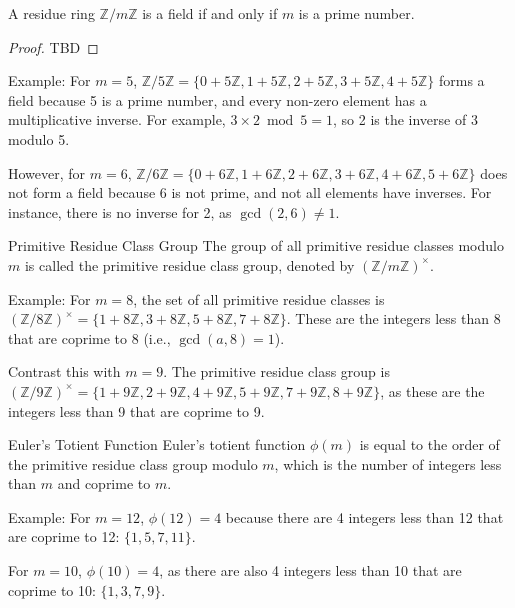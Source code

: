 \documentclass{article}
\begin{document}
\begin{theorem}{}{}
A residue ring $\mathbb{Z} / m\mathbb{Z}$ is a field if and only if $m$ is a prime number.
\end{theorem}

\begin{proof}
    TBD
\end{proof}

Example: For $m = 5$, $\mathbb{Z}/5\mathbb{Z} = \{0 + 5\mathbb{Z}, 1 + 5\mathbb{Z}, 2 + 5\mathbb{Z}, 3 + 5\mathbb{Z}, 4 + 5\mathbb{Z}\}$ forms a field because 5 is a prime number, and every non-zero element has a multiplicative inverse. For example, $3 \times 2 \bmod 5 = 1$, so 2 is the inverse of 3 modulo 5.

However, for $m = 6$, $\mathbb{Z}/6\mathbb{Z} = \{0 + 6\mathbb{Z}, 1+ 6\mathbb{Z}, 2+ 6\mathbb{Z}, 3+ 6\mathbb{Z}, 4+ 6\mathbb{Z}, 5+ 6\mathbb{Z}\}$ does not form a field because 6 is not prime, and not all elements have inverses. For instance, there is no inverse for 2, as $\gcd(2, 6) \neq 1$.

\begin{definition}{Primitive Residue Class Group}{}
The group of all primitive residue classes modulo $m$ is called the primitive residue class group, denoted by $(\mathbb{Z}/m\mathbb{Z})^{\times}$.
\end{definition}

Example: For $m = 8$, the set of all primitive residue classes is $(\mathbb{Z}/8\mathbb{Z})^{\times} = \{1 + 8\mathbb{Z}, 3 + 8\mathbb{Z}, 5 + 8\mathbb{Z}, 7 + 8\mathbb{Z}\}$. These are the integers less than 8 that are coprime to 8 (i.e., $\gcd(a, 8) = 1$).

Contrast this with $m = 9$. The primitive residue class group is $(\mathbb{Z}/9\mathbb{Z})^{\times} = \{1 + 9\mathbb{Z}, 2 + 9\mathbb{Z}, 4 + 9\mathbb{Z}, 5 + 9\mathbb{Z}, 7 + 9\mathbb{Z}, 8 + 9\mathbb{Z}\}$, as these are the integers less than 9 that are coprime to 9.


\begin{definition}{Euler's Totient Function}{}
Euler's totient function $\phi(m)$ is equal to the order of the primitive residue class group modulo $m$, which is the number of integers less than $m$ and coprime to $m$.
\end{definition}

Example: For $m = 12$, $\phi(12) = 4$ because there are 4 integers less than 12 that are coprime to 12: $\{1, 5, 7, 11\}$.

For $m = 10$, $\phi(10) = 4$, as there are also 4 integers less than 10 that are coprime to 10: $\{1, 3, 7, 9\}$.
\end{document}
